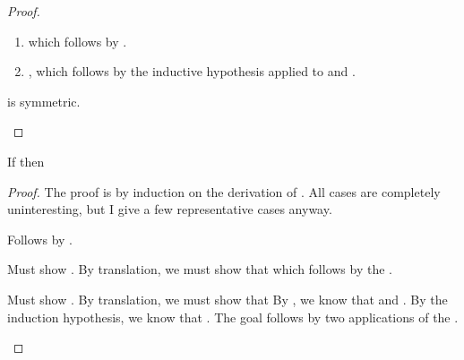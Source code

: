 \begin{proof}
\begin{proofcases}
\begin{enumerate}
    \item \im{\absccmodel{\tetwo} \stepstar \absccmodel{\tetwopr}} which follows by .

    \item \im{{\subst{\absccmodel{\teonepr}}{\absccmodel{\tepr}}{\sxpr}} \equiv
      \sappe{\absccmodel{\tetwopr}}{\sx}}, which follows by the inductive hypothesis
      applied to \im{\subst{\teone}{\tepr}{\txpr} \equiv \tappe{\tetwopr}{\tx}} and .
    \end{enumerate}

    \item {} is symmetric.
  \end{proofcases}
\end{proof}

\begin{lemma}
  \label{lem:abs-cc:m:subtype-pres}
  If \im{\tsubtyjudg{\tlenv}{\tA}{\tB}} then \im{\ssubtyjudg{\absccmodel{\tlenv}}{\absccmodel{\tA}}{\absccmodel{\tB}}}
\end{lemma}
\begin{proof}
  The proof is by induction on the derivation of \im{\tsubtyjudg{\tlenv}{\tA}{\tB}}.
  All cases are completely uninteresting, but I give a few representative
  cases anyway.
  \begin{proofcases}
    \item {}

      Follows by .

    \item {}

      Must show .
      By translation, we must show that  which follows by the \slang
      .

    \item {}

      Must show \im{\absccmodel{\tcodety{\tnone:\tAone,\txone:\tAonepr}{\tBone}} \subtypesym
        \absccmodel{\tcodety{\tntwo:\tAtwo,\txtwo:\tAtwopr}{\tBtwo}}}.
      By translation, we must show that
      \im{\spity{\snone}{\absccmodel{\tAone}}{\spity{\sxone}{\absccmodel{\tAonepr}}{\absccmodel{\tBone}}}
          \subtypesym
          \spity{\sntwo}{\absccmodel{\tAtwo}}{\spity{\sxtwo}{\absccmodel{\tAtwopr}}{\absccmodel{\tBtwo}}}}
      By , we know that
      \im{\absccmodel{\tAone} \equiv \absccmodel{\tAonepr}} and
      \im{\absccmodel{\tAtwo \equiv \tAtwopr}}.
      By the induction hypothesis, we know that \im{\absccmodel{\tBone} \subtypesym \absccmodel{\tBtwo}}.
      The goal follows by two applications of the \slang {}.
  \end{proofcases}
\end{proof}

